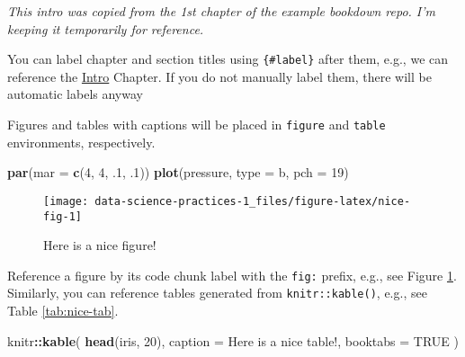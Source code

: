 \documentclass[
]{book}
\newenvironment{Shaded}{\begin{snugshade}}{\end{snugshade}}
\newcommand{\DataTypeTok}[1]{\textcolor[rgb]{0.13,0.29,0.53}{#1}}
\newcommand{\DecValTok}[1]{\textcolor[rgb]{0.00,0.00,0.81}{#1}}
\newcommand{\FloatTok}[1]{\textcolor[rgb]{0.00,0.00,0.81}{#1}}
\newcommand{\KeywordTok}[1]{\textcolor[rgb]{0.13,0.29,0.53}{\textbf{#1}}}
\newcommand{\NormalTok}[1]{#1}
\newcommand{\OperatorTok}[1]{\textcolor[rgb]{0.81,0.36,0.00}{\textbf{#1}}}
\newcommand{\OtherTok}[1]{\textcolor[rgb]{0.56,0.35,0.01}{#1}}
\newcommand{\StringTok}[1]{\textcolor[rgb]{0.31,0.60,0.02}{#1}}
\begin{document}
\emph{This intro was copied from the 1st chapter of the example bookdown repo. I'm keeping it temporarily for reference.}

You can label chapter and section titles using \texttt{\{\#label\}} after them, e.g., we can reference the \protect\hyperlink{intro}{Intro} Chapter. If you do not manually label them, there will be automatic labels anyway

Figures and tables with captions will be placed in \texttt{figure} and \texttt{table} environments, respectively.

\begin{Shaded}
\begin{Highlighting}[]
\KeywordTok{par}\NormalTok{(}\DataTypeTok{mar =} \KeywordTok{c}\NormalTok{(}\DecValTok{4}\NormalTok{, }\DecValTok{4}\NormalTok{, }\FloatTok{.1}\NormalTok{, }\FloatTok{.1}\NormalTok{))}
\KeywordTok{plot}\NormalTok{(pressure, }\DataTypeTok{type =} \StringTok{\textquotesingle{}b\textquotesingle{}}\NormalTok{, }\DataTypeTok{pch =} \DecValTok{19}\NormalTok{)}
\end{Highlighting}
\end{Shaded}

\begin{figure}

{\centering \texttt{[image: data-science-practices-1\_files/figure-latex/nice-fig-1]} 

}

\caption{Here is a nice figure!}\label{fig:nice-fig}
\end{figure}

Reference a figure by its code chunk label with the \texttt{fig:} prefix, e.g., see Figure \ref{fig:nice-fig}. Similarly, you can reference tables generated from \texttt{knitr::kable()}, e.g., see Table \ref{tab:nice-tab}.

\begin{Shaded}
\begin{Highlighting}[]
\NormalTok{knitr}\OperatorTok{::}\KeywordTok{kable}\NormalTok{(}
  \KeywordTok{head}\NormalTok{(iris, }\DecValTok{20}\NormalTok{), }\DataTypeTok{caption =} \StringTok{\textquotesingle{}Here is a nice table!\textquotesingle{}}\NormalTok{,}
  \DataTypeTok{booktabs =} \OtherTok{TRUE}
\NormalTok{)}
\end{Highlighting}
\end{Shaded}
\end{document}
